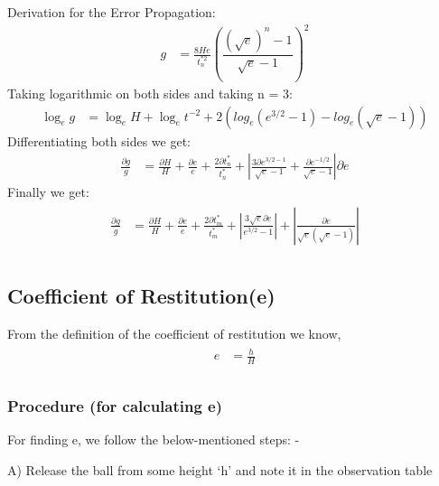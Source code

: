 \documentclass[11pt]{scrartcl} %
\begin{document}
Derivation for the Error Propagation:
\begin{align} 
		g &= \frac{8He}{t_{n}^{*2}}\left(\dfrac{(\sqrt{e})^n-1}{\sqrt{e}-1}\right)^2 \nonumber
\end{align}
    Taking logarithmic on both sides and taking n = 3:
\begin{align} 
            \log_e g &= \log_e H + \log_e t^{-2} + 2(log_e ({e^{3/2}-1}) - log_e ({\sqrt{e}-1})) \nonumber
\end{align}
    Differentiating both sides we get:
\begin{align} 
        \frac{\partial{g}}{g} &= \frac{\partial{H}}{H} + \frac{\partial{e}}{e} + \frac{2\partial{t_n^*}}{t_n^*} + \left|\frac{3\partial{e^{3/2-1}}}{\sqrt{e}-1} + \frac{\partial{e^{-1/2}}}{\sqrt{e}-1}\right|\partial{e} \nonumber
\end{align}
   Finally we get:
\begin{align} 
	\begin{split}
		\frac{\partial{g}}{g} &= \frac{\partial{H}}{H} + \frac{\partial{e}}{e}+\frac{2\partial{t_m^*}}{t_m^*}+\left|\frac{3\sqrt{e}\partial{e}}{e^{3/2}-1}\right|+\left|\frac{\partial{e}}{\sqrt{e}(\sqrt{e}-1)}\right|\\
	\end{split}					
\end{align}

\subsection{Coefficient of Restitution(e)}
From the definition of the coefficient of restitution we know, 
\begin{align} 
	\begin{split}
		e &= \frac{h}{H}\\
	\end{split}					
\end{align}

\subsubsection{Procedure (for calculating e)}
For finding e, we follow the below-mentioned steps: - \par

A) Release the ball from some height ‘h’ and note it in the observation table \par
\end{document}
